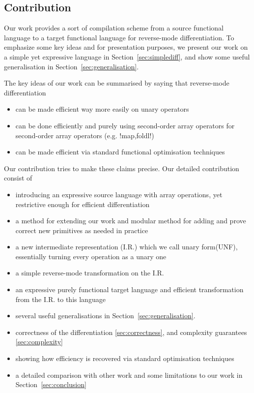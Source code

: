 \subsection{Contribution}

Our work provides a sort of compilation scheme from a source functional language to a target functional language for reverse-mode differentiation.
To emphasize some key ideas and for presentation purposes, we present our work on a simple yet expressive language in Section~\ref{sec:simplediff}, 
and show some useful generalisation in Section~\ref{sec:generalisation}. 

The key ideas of our work can be summarised by saying that reverse-mode differentiation
\begin{itemize}
   \item can be made efficient way more easily on unary operators
   \item can be done efficiently and purely using second-order array operators for second-order array operators (e.g. !map,foldl!) 
   \item can be made efficient via standard functional optimisation techniques
\end{itemize}

Our contribution tries to make these claims precise. Our detailed  contribution consist of
\begin{itemize}
    \item introducing an expressive source language with array operations, yet restrictive enough for efficient differentiation
    \item a method for extending our work and modular method for adding and prove correct new primitives as needed in practice 
    \item a new intermediate representation (I.R.) which we call unary form(UNF), essentially turning every operation as a unary one
    \item a simple reverse-mode transformation on the I.R.
    \item an expressive purely functional target language and efficient transformation from the I.R. to this language
    \item several useful generalisations in Section~\ref{sec:generalisation}. 
    \item correctness of the differentiation \ref{sec:correctness}, and complexity guarantees \ref{sec:complexity}
    \item showing how efficiency  is recovered via standard optimisation techniques
    \item a detailed comparison with other work and some limitations to our work in Section~\ref{sec:conclusion}
\end{itemize}

